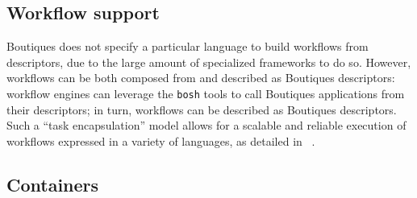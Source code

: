 \documentclass[a4paper,num-refs]{oup-contemporary}
\newcommand{\boutiques}{Boutiques\xspace}
\newcommand{\notimplementedyet}[1]{\color{blue}\emph{#1}\footnote{Still needs to be implemented}\color{black}\xspace}
\begin{document}


\subsection{Workflow support}

\boutiques does not specify a particular language to build workflows
from descriptors, due to the large amount of specialized frameworks to
do so. However, workflows can be both composed from and described as
\boutiques descriptors: workflow engines can leverage the
\texttt{bosh} tools to call \boutiques applications from their
descriptors; in turn, workflows can be described as \boutiques
descriptors. Such a ``task encapsulation'' model allows for a scalable
and reliable execution of workflows expressed in a variety of
languages, as detailed in ~\cite{GLATARD2017239}.

\subsection{Containers}
\end{document}
